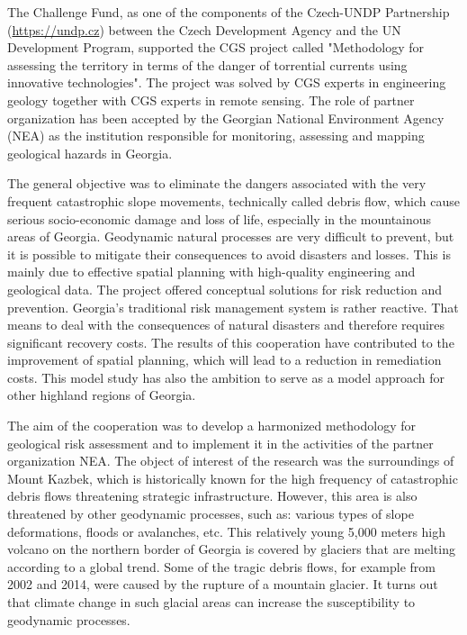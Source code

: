 {The Challenge Fund, as one of the components of the Czech-UNDP Partnership (\url{https://undp.cz}) between the Czech Development Agency and the UN Development Program, supported the CGS project called "Methodology for assessing the territory in terms of the danger of torrential currents using innovative technologies". The project was solved by CGS experts in engineering geology together with CGS experts in remote sensing. The role of partner organization has been accepted by the Georgian National Environment Agency (NEA) as the institution responsible for monitoring, assessing and mapping geological hazards in Georgia. 

The general objective was to eliminate the dangers associated with the very frequent catastrophic slope movements, technically called debris flow, which cause serious socio-economic damage and loss of life, especially in the mountainous areas of Georgia. Geodynamic natural processes are very difficult to prevent, but it is possible to mitigate their consequences to avoid disasters and losses. This is mainly due to effective spatial planning with high-quality engineering and geological data. The project offered conceptual solutions for risk reduction and prevention. Georgia's traditional risk management system is rather reactive. That means to deal with the consequences of natural disasters and therefore requires significant recovery costs. The results of this cooperation have contributed to the improvement of spatial planning, which will lead to a reduction in remediation costs. This model study has also the ambition to serve as a model approach for other highland regions of Georgia.

The aim of the cooperation was to develop a harmonized methodology for geological risk assessment and to implement it in the activities of the partner organization NEA. The object of interest of the research was the surroundings of Mount Kazbek, which is historically known for the high frequency of catastrophic debris flows threatening strategic infrastructure. However, this area is also threatened by other geodynamic processes, such as: various types of slope deformations, floods or avalanches, etc. This relatively young 5,000 meters high volcano on the northern border of Georgia is covered by glaciers that are melting according to a global trend. Some of the tragic debris flows, for example from 2002 and 2014, were caused by the rupture of a mountain glacier. It turns out that climate change in such glacial areas can increase the susceptibility to geodynamic processes. 

}

